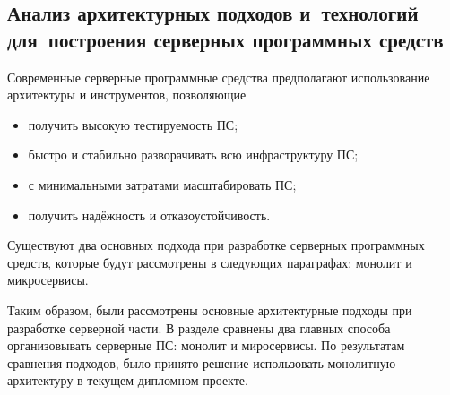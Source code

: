 \subsection{Анализ архитектурных подходов и~технологий для~построения серверных программных средств}
\label{sec:analysis:research:backArch}

Современные серверные программные средства предполагают использование архитектуры и инструментов, позволяющие

\begin{itemize}
\item получить высокую тестируемость ПС;
\item быстро и стабильно разворачивать всю инфраструктуру ПС;
\item с минимальными затратами масштабировать ПС;
\item получить надёжность и отказоустойчивость.
\end{itemize}

Существуют два основных подхода при разработке серверных программных средств, которые будут рассмотрены в следующих параграфах: монолит и микросервисы.




Таким образом, были рассмотрены основные архитектурные подходы при разработке серверной части. В разделе сравнены два главных способа организовывать серверные ПС: монолит и миросервисы. По результатам сравнения подходов, было принято решение использовать монолитную архитектуру в текущем дипломном проекте.